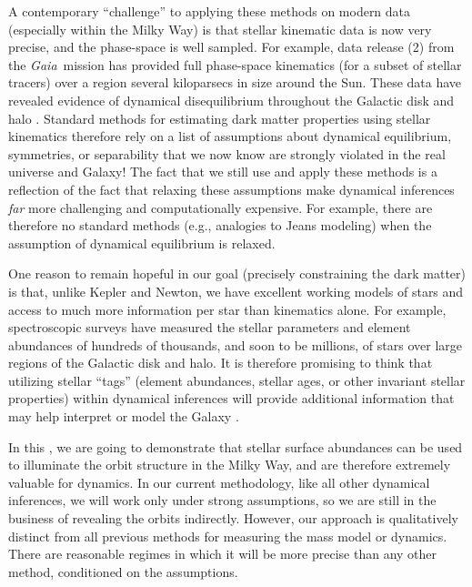 \documentclass[modern]{aastex63}
\newcommand{\gaia}{\textsl{Gaia}}
\newcommand{\dr}[1]{\acronym{DR}#1}
\begin{document}
A contemporary ``challenge'' to applying these methods on modern data
(especially within the Milky Way) is that stellar kinematic data is now very
precise, and the phase-space is well sampled.
For example, data release (\dr{2}) from the \gaia\ mission
\citep{Gaia-Collaboration:2016, Gaia-Collaboration:2018} has provided full
phase-space kinematics (for a subset of stellar tracers) over a region several
kiloparsecs in size around the Sun.
These data have revealed evidence of dynamical disequilibrium throughout the
Galactic disk and halo \citep{Antoja:2018, Myeong:2018, Koppelman:2018,
Eilers:2020}.
Standard methods for estimating dark matter properties using stellar kinematics
therefore rely on a list of assumptions about dynamical equilibrium, symmetries,
or separability that we now know are strongly violated in the real universe and
Galaxy!
The fact that we still use and apply these methods is a reflection of the fact
that relaxing these assumptions make dynamical inferences \emph{far} more
challenging and computationally expensive.
For example, there are therefore no standard methods (e.g., analogies to Jeans
modeling) when the assumption of dynamical equilibrium is relaxed.

One reason to remain hopeful in our goal (precisely constraining the dark
matter) is that, unlike Kepler and Newton, we have excellent working models of
stars and access to much more information per star than kinematics alone.
For example, spectroscopic surveys have measured the stellar parameters and
element abundances of hundreds of thousands, and soon to be millions, of stars
\citep[e.g.,][]{DR16, Martell:2017, Deng:2012} over large regions of the
Galactic disk and halo.
It is therefore promising to think that utilizing stellar ``tags'' (element
abundances, stellar ages, or other invariant stellar properties) within
dynamical inferences will provide additional information that may help interpret
or model the Galaxy \citep[see, e.g.,][for recent methods that begin to move in
this direction, within the context of equilibrium models]{Sanders:2015,
Das:2016, Binney:2016, Iorio:2020}.

In this \documentname, we are going to demonstrate that stellar surface
abundances can be used to illuminate the orbit structure in the Milky Way, and
are therefore extremely valuable for dynamics.
In our current methodology, like all other dynamical inferences, we will work
only under strong assumptions, so we are still in the business of revealing the
orbits indirectly.
However, our approach is qualitatively distinct from all previous methods for
measuring the mass model or dynamics.
There are reasonable regimes in which it will be
more precise than any other method, conditioned on the assumptions.
\end{document}
